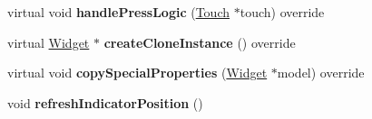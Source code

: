 \begin{DoxyCompactItemize}
virtual void {\bfseries handle\+Press\+Logic} (\hyperlink{classTouch}{Touch} $\ast$touch) override
\item 
\mbox{\label{classui_1_1PageView_a148b156a73b92ffe62829afbc96dbd97}} 
virtual \hyperlink{classui_1_1Widget}{Widget} $\ast$ {\bfseries create\+Clone\+Instance} () override
\item 
\mbox{\label{classui_1_1PageView_ae2aee85464787907712c5563bafcb3fd}} 
virtual void {\bfseries copy\+Special\+Properties} (\hyperlink{classui_1_1Widget}{Widget} $\ast$model) override
\item 
\mbox{\label{classui_1_1PageView_ac41eee2f48d36be3816f90024cb01ab5}} 
void {\bfseries refresh\+Indicator\+Position} ()
\end{DoxyCompactItemize}
